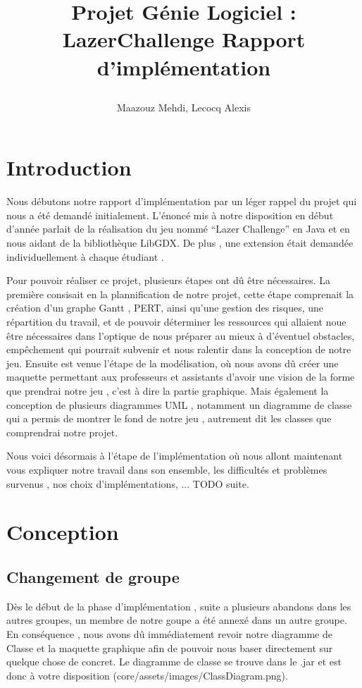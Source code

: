 \documentclass[a4paper,10pt]{article}
\title{
    \begin{minipage}\linewidth
        \centering\bfseries\sffamily
        Projet Génie Logiciel : LazerChallenge
        \vskip3pt
        \large Rapport d'implémentation
    \end{minipage}
    }
\author{Maazouz Mehdi, Lecocq Alexis}
\begin{document}
\maketitle
\tableofcontents
\newpage
\section{Introduction}
Nous débutons notre rapport d'implémentation par un léger rappel du projet qui nous a été demandé initialement. 
L'énoncé mis à notre disposition en début d'année parlait de la réalisation du jeu nommé ``Lazer Challenge'' en Java
et en nous aidant de la bibliothèque LibGDX. De plus , une extension était demandée individuellement à chaque étudiant .

Pour pouvoir réaliser ce projet, plusieurs étapes ont dû être nécessaires. La première consisait en la plannification de notre projet,
 cette étape comprenait la création d'un graphe Gantt , PERT, ainsi qu'une gestion des risques, une répartition du travail,
  et de pouvoir déterminer les ressources qui allaient noue être nécessaires dans l'optique de nous préparer au mieux à d'éventuel
 obstacles, empêchement qui pourrait subvenir et nous ralentir dans la conception de notre jeu. Ensuite est venue l'étape de la modélisation, où nous
 avons dû créer une maquette permettant aux professeurs et assistants d'avoir une vision de la forme que prendrai notre jeu , c'est à dire la partie graphique.
 Mais également la conception de plusieurs diagrammes UML , notamment un diagramme de classe qui a permis de montrer le fond de notre jeu , autrement dit les classes
 que comprendrai notre projet.
 
 Nous voici désormais à l'étape de l'implémentation où nous allont maintenant vous expliquer notre travail dans son ensemble,
 les difficultés et problèmes survenus , nos choix d'implémentations, ... TODO suite.
 
\section{Conception}
\subsection{Changement de groupe}
Dès le début de la phase d'implémentation , suite a plusieurs abandons dans les autres groupes, un membre de notre goupe a été annexé dans un autre groupe.
En conséquence , nous avons dû immédiatement revoir notre diagramme de Classe et la maquette graphique afin de pouvoir nous baser directement sur quelque chose
de concret. Le diagramme de classe se trouve dans le .jar et est donc à votre disposition (core/assets/images/ClassDiagram.png).
\end{document}
